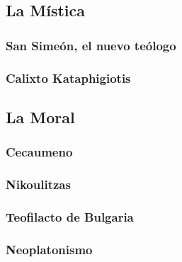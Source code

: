 \subsection{La Mística}
	\subsubsection{San Simeón, el nuevo teólogo}
	
	\subsubsection{Calixto Kataphigiotis}
	
\subsection{La Moral}
	
	\subsubsection{Cecaumeno}
	\subsubsection{Nikoulitzas}
	\subsubsection{Teofilacto de Bulgaria}
	\subsubsection{Neoplatonismo}
	

